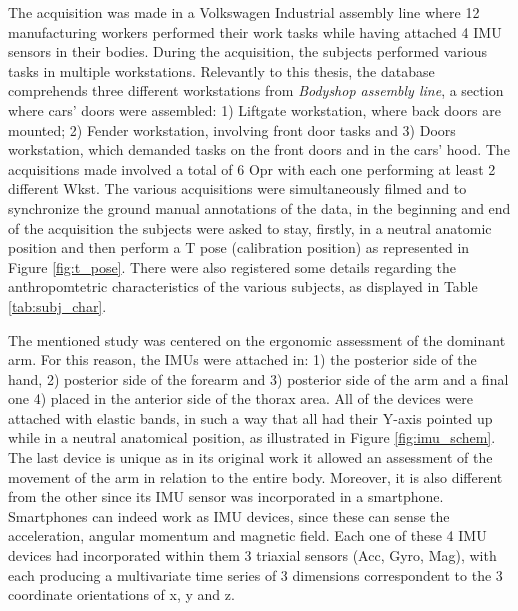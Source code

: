 The acquisition was made in a Volkswagen Industrial assembly line where 12 manufacturing workers performed their work tasks while having attached 4 \gls{IMU} sensors in their bodies.
During the acquisition, the subjects performed various tasks in multiple workstations. Relevantly to this thesis, the database comprehends three different workstations from \textit{Bodyshop assembly line}, a section where cars' doors were assembled: 1) Liftgate workstation, where back doors are mounted; 2) Fender workstation, involving front door tasks and 3) Doors workstation, which demanded tasks on the front doors and in the cars' hood\cite{Santos2019}. The acquisitions made involved a total of 6 \gls{Opr} with each one performing at least 2 different \gls{Wkst}. The various acquisitions were simultaneously filmed and to synchronize the ground manual annotations of the data, in the beginning and end of the acquisition the subjects were asked to stay, firstly, in a neutral anatomic position and then perform a T pose (calibration position) as represented in Figure \ref{fig:t_pose}. There were also registered some details regarding the anthropomtetric characteristics of the various subjects, as displayed in Table \ref{tab:subj_char}.

The mentioned study was centered on the ergonomic assessment of the dominant arm. For this reason, the \gls{IMU}s  were attached in: 1) the posterior side of the hand, 2) posterior side of the forearm and 3) posterior side of the arm and a final one 4) placed in the anterior side of the thorax area. All of the devices were attached with elastic bands, in such a way that all had their Y-axis pointed up while in a neutral anatomical position, as illustrated in Figure \ref{fig:imu_schem}. The last device is unique as in its original work it allowed an assessment of the movement of the arm in relation to the entire body. Moreover, it is also different from the other since its \gls{IMU} sensor was incorporated in a smartphone. Smartphones can indeed work as \gls{IMU} devices, since these can sense the acceleration, angular momentum and magnetic field.
Each one of these 4 \gls{IMU} devices had incorporated within them 3 triaxial sensors (\gls{Acc}, \gls{Gyro}, \gls{Mag}), with each producing a multivariate time series of 3 dimensions correspondent to the 3 coordinate orientations of x, y and z.

